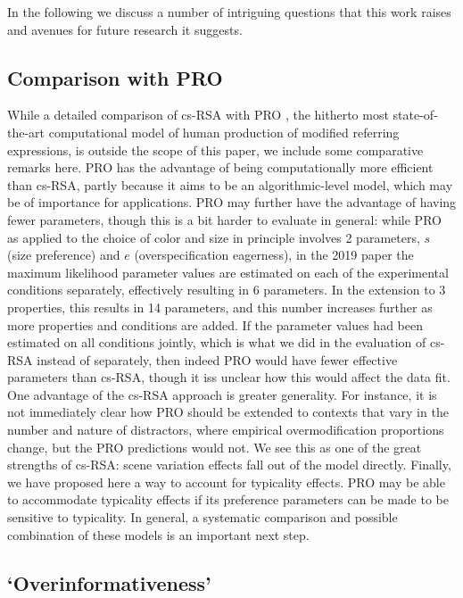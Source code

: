 \documentclass[11pt]{article}
\begin{document}
In the following we discuss a number of intriguing questions that this work raises and avenues for future research it suggests.

\subsection{Comparison with PRO}

While a detailed comparison of cs-RSA with PRO \cite{VanGompel2019}, the hitherto most state-of-the-art computational model of human production of modified referring expressions, is outside the scope of this paper, we include some comparative remarks here. PRO has the advantage of being computationally more efficient than cs-RSA, partly because it aims to be an algorithmic-level model, which may be of importance for applications. PRO may further have the advantage of having fewer parameters, though this is a bit harder to evaluate in general: while PRO as applied to the choice of color and size in principle involves 2 parameters, $s$ (size preference) and $e$ (overspecification eagerness), in the 2019 paper the maximum likelihood parameter values are estimated on each of the experimental conditions separately, effectively resulting in 6 parameters. In the extension to 3 properties, this results in 14 parameters, and this number increases further as more properties and conditions are added. If the parameter values had been estimated on all conditions jointly, which is what we did in the evaluation of cs-RSA instead of separately, then indeed PRO would have fewer effective parameters than cs-RSA, though it iss unclear how this would affect the data fit. One advantage of the cs-RSA approach is greater generality. For instance, it is not immediately clear how PRO should be extended to contexts that vary in the number and nature of distractors, where empirical overmodification proportions  change, but the PRO predictions would not. We see this as one of the great strengths of cs-RSA: scene variation effects fall out of the model directly. Finally, we have proposed here a way to account for typicality effects. PRO may be able to accommodate typicality effects if its preference parameters can be made to be sensitive to typicality. In general, a systematic comparison and possible combination of these models is an important next step.

\subsection{`Overinformativeness'}
\end{document}
